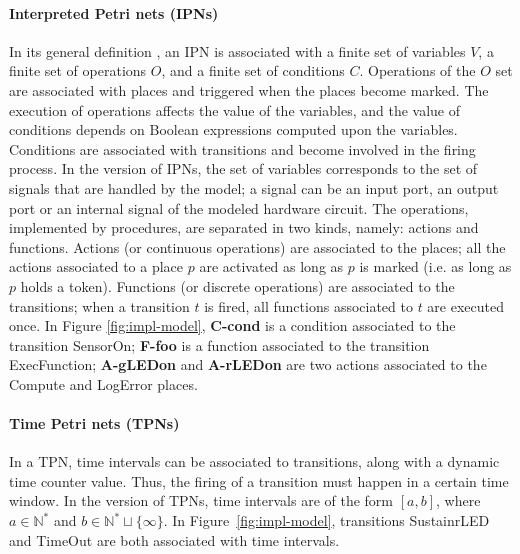 \documentclass[pdflatex,sn-mathphys]{sn-jnl}%
\theoremstyle{thmstyleone}%
\theoremstyle{thmstyletwo}%
\theoremstyle{thmstylethree}%
\begin{document}
\paragraph{Interpreted Petri nets (IPNs)}
In its general definition \cite{David1994}, an IPN is associated with
a finite set of variables $V$, a finite set of operations $O$, and a
finite set of conditions $C$. Operations of the $O$ set are associated
with places and triggered when the places become marked. The execution
of operations affects the value of the variables, and the value of
conditions depends on Boolean expressions computed upon the variables.
Conditions are associated with transitions and become involved in the
firing process.  In the \hilecop{} version of
IPNs, %
the set of variables corresponds to the set of \vhdl{} signals that
are handled by the model; a signal can be an input port, an output
port or an internal signal of the modeled hardware circuit. The
operations, implemented by \vhdl{} procedures, are separated in two
kinds, namely: actions and functions. Actions (or continuous
operations) are associated to the places; all the actions associated
to a place $p$ are activated as long as $p$ is marked (i.e. as long as
$p$ holds a token). Functions (or discrete operations) are associated
to the transitions; when a transition $t$ is fired, all functions
associated to $t$ are executed once. In Figure \ref{fig:impl-model},
\textbf{C-cond} is a condition associated to the transition SensorOn;
\textbf{F-foo} is a function associated to the transition
ExecFunction; \textbf{A-gLEDon} and \textbf{A-rLEDon} are two actions
associated to the Compute and LogError places.

\paragraph{Time Petri nets (TPNs)}

In a TPN, time intervals can be associated to transitions, along with
a dynamic time counter value. Thus, the firing of a transition must
happen in a certain time window. In the \hilecop{} version of TPNs,
time intervals are of the form $[a, b]$, where $a\in\mathbb{N}^{*}$
and $b\in\mathbb{N}^{*}\sqcup\{\infty\}$.  In
Figure~\ref{fig:impl-model}, transitions SustainrLED and TimeOut are
both associated with time intervals.
\end{document}

